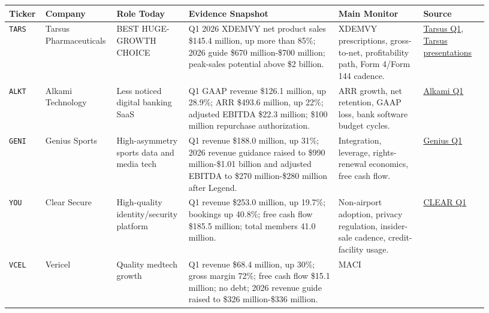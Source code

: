 \documentclass[
  9pt,
]{article}
\begin{document}
\scriptsize
\begin{longtable}[]{@{}L{0.07\linewidth}L{0.12\linewidth}L{0.14\linewidth}L{0.30\linewidth}L{0.17\linewidth}L{0.13\linewidth}@{}}
\toprule
Ticker & Company & Role Today & Evidence Snapshot & Main Monitor &
Source \\
\midrule
\endhead
\texttt{TARS} & Tarsus Pharmaceuticals & BEST HUGE-GROWTH CHOICE & Q1
2026 XDEMVY net product sales \$145.4 million, up more than 85\%; 2026
guide \$670 million-\$700 million; peak-sales potential above \$2
billion. & XDEMVY prescriptions, gross-to-net, profitability path, Form
4/Form 144 cadence. &
\href{https://ir.tarsusrx.com/news-releases/news-release-details/tarsus-reports-first-quarter-2026-financial-results-and-recent/}{Tarsus
Q1},
\href{https://ir.tarsusrx.com/events-and-presentations/presentations/}{Tarsus
presentations} \\
\texttt{ALKT} & Alkami Technology & Less noticed digital banking SaaS &
Q1 GAAP revenue \$126.1 million, up 28.9\%; ARR \$493.6 million, up
22\%; adjusted EBITDA \$22.3 million; \$100 million repurchase
authorization. & ARR growth, net retention, GAAP loss, bank software
budget cycles. &
\href{https://investors.alkami.com/2026-04-29-Alkami-Announces-First-Quarter-2026-Financial-Results}{Alkami
Q1} \\
\texttt{GENI} & Genius Sports & High-asymmetry sports data and media
tech & Q1 revenue \$188.0 million, up 31\%; 2026 revenue guidance raised
to \$990 million-\$1.01 billion and adjusted EBITDA to \$270
million-\$280 million after Legend. & Integration, leverage,
rights-renewal economics, free cash flow. &
\href{https://investors.geniussports.com/news/news-details/2026/Genius-Sports-Reports-31-Revenue-Growth-and-21-Adjusted-EBITDA-Growth-Raises-2026-Guidance-Targeting-28-Adjusted-EBITDA-Margin-Following-Legend-Acquisition/default.aspx}{Genius
Q1} \\
\texttt{YOU} & Clear Secure & High-quality identity/security platform &
Q1 revenue \$253.0 million, up 19.7\%; bookings up 40.8\%; free cash
flow \$185.5 million; total members 41.0 million. & Non-airport
adoption, privacy regulation, insider-sale cadence, credit-facility
usage. &
\href{https://ir.clearme.com/news-events/press-releases/detail/184/clear-announces-first-quarter-2026-financial-results}{CLEAR
Q1} \\
\texttt{VCEL} & Vericel & Quality medtech growth & Q1 revenue \$68.4
million, up 30\%; gross margin 72\%; free cash flow \$15.1 million; no
debt; 2026 revenue guide raised to \$326 million-\$336 million. & MACI

\end{longtable}
\end{document}
